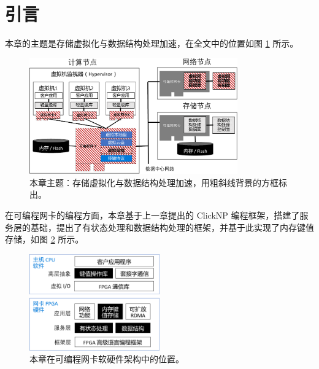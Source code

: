 \section{引言}
\label{kvdirect:sec:introduction}

本章的主题是存储虚拟化与数据结构处理加速，在全文中的位置如图 \ref{kvdirect:fig:sys-arch} 所示。

\begin{figure}[htbp]
	\centering
	\includegraphics[width=0.8\textwidth]{figure/sys_arch.pdf}
	\caption{本章主题：存储虚拟化与数据结构处理加速，用粗斜线背景的方框标出。}
	\label{kvdirect:fig:sys-arch}
\end{figure}

在可编程网卡的编程方面，本章基于上一章提出的 ClickNP 编程框架，搭建了服务层的基础，提出了有状态处理和数据结构处理的框架，并基于此实现了内存键值存储，如图 \ref{kvdirect:fig:sw-hw-codesign} 所示。

\begin{figure}[htbp]
	\centering
	\includegraphics[width=0.5\textwidth]{figure/sw_hw_codesign.pdf}
	\caption{本章在可编程网卡软硬件架构中的位置。}
	\label{kvdirect:fig:sw-hw-codesign}
\end{figure}


